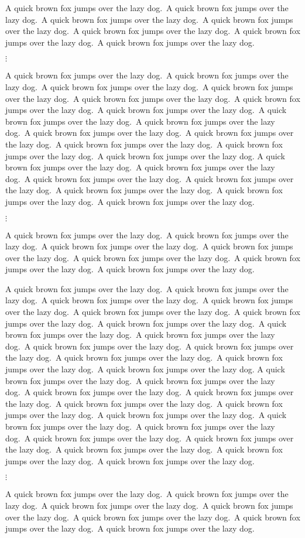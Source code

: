 \documentclass{article}
\begin{document}
\def\fox{A quick brown fox jumps over the lazy dog.}
\def\foxes{\fox\ \fox\ \fox\ \fox\ \fox\ \fox\ \fox} 
\def\note{This is a marginal note.}
\def\notes{\note\ \note\ \note\ \note\ \note}
\def\mpi{\marginpar{\footnotesize\notes}}
\def\mpii{\marginpar[\footnotesize$\Rightarrow$ 
This is a \textbf{left-side} 
marginal note. \notes]
{\footnotesize$\Leftarrow$\ \notes}}

\let\mpi\relax
\let\mpii\relax

\foxes
\vfill
\centerline{$\vdots$}
\vfill
\foxes\ \foxes
\mpi
\foxes
\vfill
\centerline{$\vdots$}
\vfill
\foxes
\clearpage

\foxes\ \foxes
\mpii
\foxes\ \foxes
\vfill
\centerline{$\vdots$}
\vfill
\foxes
\end{document}
